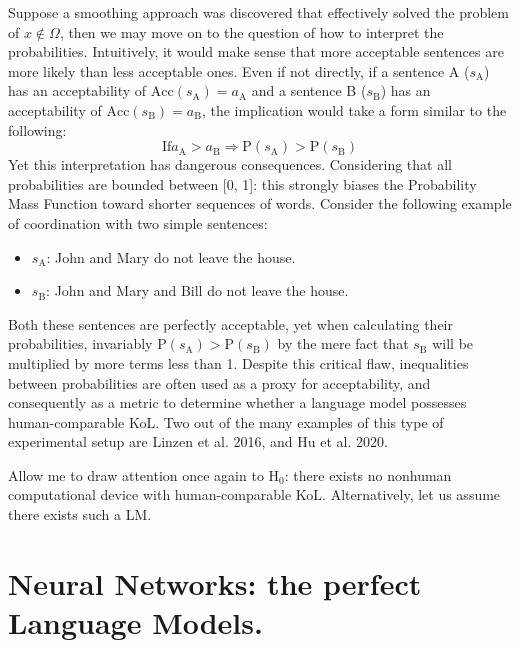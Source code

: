 Suppose a smoothing approach was discovered that effectively solved the problem of $x \notin \Omega$, then we may move on to the question of how to interpret the probabilities.  Intuitively, it would make sense that more acceptable sentences are more likely than less acceptable ones.  Even if not directly, if a sentence A ($s_\mathrm{A}$) has an acceptability of $\mathrm{Acc}(s_\mathrm{A}) = a_\mathrm{A}$ and a sentence B ($s_\mathrm{B}$) has an acceptability of $\mathrm{Acc}(s_\mathrm{B}) = a_\mathrm{B}$, the implication would take a form similar to the following:
$$\mathrm{If} a_\mathrm{A} > a_\mathrm{B} \Rightarrow \mathrm{P}(s_\mathrm{A}) > \mathrm{P}(s_\mathrm{B})$$
Yet this interpretation has dangerous consequences.  Considering that all probabilities are bounded between [0, 1]: this strongly biases the Probability Mass Function toward shorter sequences of words.  Consider the following example of coordination with two simple sentences:
\begin{itemize}
    \item $s_{\mathrm{A}}$: John and Mary do not leave the house.
    \item $s_{\mathrm{B}}$: John and Mary and Bill do not leave the house.
\end{itemize}
Both these sentences are perfectly acceptable, yet when calculating their probabilities, invariably $\mathrm{P}(s_\mathrm{A}) > \mathrm{P}(s_\mathrm{B})$ by the mere fact that $s_\mathrm{B}$ will be multiplied by more terms less than 1.  Despite this critical flaw, inequalities between probabilities are often used as a proxy for acceptability, and consequently as a metric to determine whether a language model possesses human-comparable KoL.  Two out of the many examples of this type of experimental setup are Linzen et al. 2016, and Hu et al. 2020.


Allow me to draw attention once again to $\mathrm{H}_0$: there exists no nonhuman computational device with human-comparable KoL.  Alternatively, let us assume there exists such a LM.  

\section*{Neural Networks: the perfect Language Models.}

